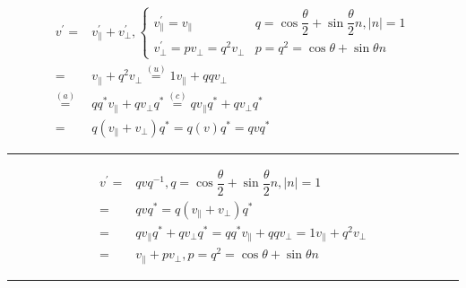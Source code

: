 \documentclass[
]{book}
\theoremstyle{definition}
\theoremstyle{definition}
\theoremstyle{definition}
\theoremstyle{definition}
\theoremstyle{remark}
\begin{document}
\[
\begin{aligned}
v^{\prime}= & v_{{\scriptscriptstyle \parallel}}^{\prime}+v_{{\scriptscriptstyle \perp}}^{\prime},\begin{cases}
v_{{\scriptscriptstyle \parallel}}^{\prime}=v_{{\scriptscriptstyle \parallel}} & q=\cos\dfrac{\theta}{2}+\sin\dfrac{\theta}{2}n,\left|n\right|=1\\
v_{{\scriptscriptstyle \perp}}^{\prime}=pv_{{\scriptscriptstyle \perp}}=q^{2}v_{{\scriptscriptstyle \perp}} & p=q^{2}=\cos\theta+\sin\theta n
\end{cases}\\
= & v_{{\scriptscriptstyle \parallel}}+q^{2}v_{{\scriptscriptstyle \perp}}\overset{\left(u\right)}{=}1v_{{\scriptscriptstyle \parallel}}+qqv_{{\scriptscriptstyle \perp}}\\
\overset{\left(a\right)}{=} & qq^{*}v_{{\scriptscriptstyle \parallel}}+qv_{{\scriptscriptstyle \perp}}q^{*}\overset{\left(c\right)}{=}qv_{{\scriptscriptstyle \parallel}}q^{*}+qv_{{\scriptscriptstyle \perp}}q^{*}\\
= & q\left(v_{{\scriptscriptstyle \parallel}}+v_{{\scriptscriptstyle \perp}}\right)q^{*}=q\left(v\right)q^{*}=qvq^{*}
\end{aligned}
\]

\begin{center}\rule{0.5\linewidth}{0.5pt}\end{center}

\[
\begin{aligned}
v^{\prime}= & qvq^{-1},q=\cos\dfrac{\theta}{2}+\sin\dfrac{\theta}{2}n,\left|n\right|=1\\
= & qvq^{*}=q\left(v_{{\scriptscriptstyle \parallel}}+v_{{\scriptscriptstyle \perp}}\right)q^{*}\\
= & qv_{{\scriptscriptstyle \parallel}}q^{*}+qv_{{\scriptscriptstyle \perp}}q^{*}=qq^{*}v_{{\scriptscriptstyle \parallel}}+qqv_{{\scriptscriptstyle \perp}}=1v_{{\scriptscriptstyle \parallel}}+q^{2}v_{{\scriptscriptstyle \perp}}\\
= & v_{{\scriptscriptstyle \parallel}}+pv_{{\scriptscriptstyle \perp}},p=q^{2}=\cos\theta+\sin\theta n
\end{aligned}
\]

\begin{center}\rule{0.5\linewidth}{0.5pt}\end{center}
\end{document}
